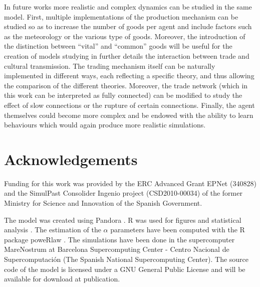 \documentclass{wscpaperproc}
\begin{document}
In future works more realistic and complex dynamics can be studied in the same model. First, multiple implementations of the production mechanism can be studied so as to increase the number of goods per agent and include factors such as the meteorology or the various type of goods. Moreover, the introduction of the distinction between ``vital'' and ``common'' goods will be useful for the creation of models studying in further details the interaction between trade and cultural transmission. The trading mechanism itself can be naturally implemented in different ways, each reflecting a specific theory, and thus allowing the comparison of the different theories. Moreover, the trade network (which in this work can be interpreted as fully connected) can be modified to study the effect of slow connections or the rupture of certain connections. Finally, the agent themselves could become more complex and be endowed with the ability to learn behaviours which would again produce more realistic simulations.

\section{Acknowledgements}

Funding for this work was provided by the ERC Advanced Grant EPNet (340828) and the SimulPast Consolider Ingenio project (CSD2010-00034) of the former Ministry for Science and Innovation of the Spanish Government. 

The model was created using Pandora \cite{rubiocampillo_2014}. R was used for figures and statistical analysis \cite{rdev_2012}. The estimation of the $\alpha$ parameters have been computed with the R package poweRlaw \cite{gillespie_fitting_2015}. The simulations have been done in the supercomputer MareNostrum at Barcelona Supercomputing Center - Centro Nacional de Supercomputación (The Spanish National Supercomputing Center). The source code of the model is licensed under a GNU General Public License and will be available for download at publication.


  
\end{document}
